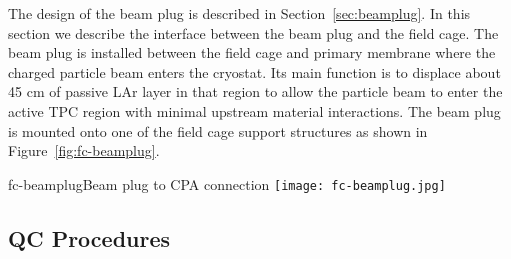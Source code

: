 The design of the beam plug is described in Section~\ref{sec:beamplug}. In this section we describe the interface between the beam plug and the field cage. The beam plug is installed between the field cage and primary membrane where the charged particle beam enters the cryostat. Its main function is to displace about 45 cm of passive LAr layer in that region to allow the particle beam to enter the active TPC region with minimal upstream material interactions. The beam plug is mounted onto one of the field cage support structures as shown in Figure~\ref{fig:fc-beamplug}.
\begin{cdrfigure}{fc-beamplug}{Beam plug to CPA connection}
\texttt{[image: fc-beamplug.jpg]}
\end{cdrfigure}






\subsection{QC Procedures}

